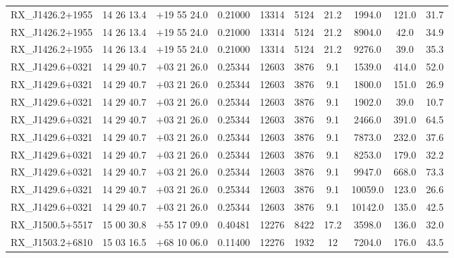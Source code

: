 \begin{landscape}
\begin{center}
\begin{longtable}{l c c c c c c c c c}
RX\_J1426.2+1955  &        14 26 13.4  &         $+$19 55 24.0  &       0.21000  & 13314  &   5124  &       21.2  &      1994.0  &  121.0  &  31.7  \\
RX\_J1426.2+1955  &        14 26 13.4  &         $+$19 55 24.0  &       0.21000  & 13314  &   5124  &       21.2  &      8904.0  &  42.0  &   34.9  \\
RX\_J1426.2+1955  &        14 26 13.4  &         $+$19 55 24.0  &       0.21000  & 13314  &   5124  &       21.2  &      9276.0  &  39.0  &   35.3  \\
RX\_J1429.6+0321  &        14 29 40.7  &         $+$03 21 26.0  &       0.25344  & 12603  &   3876  &       9.1  &       1539.0  &  414.0  &  52.0  \\
RX\_J1429.6+0321  &        14 29 40.7  &         $+$03 21 26.0  &       0.25344  & 12603  &   3876  &       9.1  &       1800.0  &  151.0  &  26.9  \\
RX\_J1429.6+0321  &        14 29 40.7  &         $+$03 21 26.0  &       0.25344  & 12603  &   3876  &       9.1  &       1902.0  &  39.0  &   10.7  \\
RX\_J1429.6+0321  &        14 29 40.7  &         $+$03 21 26.0  &       0.25344  & 12603  &   3876  &       9.1  &       2466.0  &  391.0  &  64.5  \\
RX\_J1429.6+0321  &        14 29 40.7  &         $+$03 21 26.0  &       0.25344  & 12603  &   3876  &       9.1  &       7873.0  &  232.0  &  37.6  \\
RX\_J1429.6+0321  &        14 29 40.7  &         $+$03 21 26.0  &       0.25344  & 12603  &   3876  &       9.1  &       8253.0  &  179.0  &  32.2  \\
RX\_J1429.6+0321  &        14 29 40.7  &         $+$03 21 26.0  &       0.25344  & 12603  &   3876  &       9.1  &       9947.0  &  668.0  &  73.3  \\
RX\_J1429.6+0321  &        14 29 40.7  &         $+$03 21 26.0  &       0.25344  & 12603  &   3876  &       9.1  &       10059.0  & 123.0  &  26.6  \\
RX\_J1429.6+0321  &        14 29 40.7  &         $+$03 21 26.0  &       0.25344  & 12603  &   3876  &       9.1  &       10142.0  & 135.0  &  42.5  \\
RX\_J1500.5+5517  &        15 00 30.8  &         $+$55 17 09.0  &       0.40481  & 12276  &   8422  &       17.2  &      3598.0  &  136.0  &  32.0  \\
RX\_J1503.2+6810  &        15 03 16.5  &         $+$68 10 06.0  &       0.11400  & 12276  &   1932  &       12  &        7204.0  &  176.0  &  43.5  \\

\end{longtable}
\end{center}
\end{landscape}
